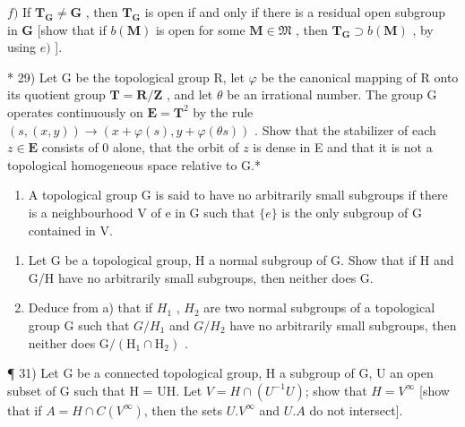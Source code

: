 \(f)\) If \(\mathbf{T}_{\mathbf{G}} \neq \mathbf{G}\) , then \(\mathbf{T}_{\mathbf{G}}\) is open if and only if there is a residual open subgroup in \(\mathbf{G}\) {[}show that if \(b(\mathbf{M})\) is open for some \(\mathbf{M} \in \mathfrak{M}\) , then \(\mathbf{T}_{\mathbf{G}} \supset b(\mathbf{M})\) , by using \(e)\) {]}.

* 29) Let G be the topological group R, let \(\varphi\) be the canonical mapping of R onto its quotient group \(\mathbf{T} = \mathbf{R} / \mathbf{Z}\) , and let \(\theta\) be an irrational number. The group G operates continuously on \(\mathbf{E} = \mathbf{T}^2\) by the rule \((s, (x, y)) \to (x + \varphi(s), y + \varphi(\theta s))\) . Show that the stabilizer of each \(z \in \mathbf{E}\) consists of 0 alone, that the orbit of \(z\) is dense in E and that it is not a topological homogeneous space relative to G.*

\begin{enumerate}
\def\labelenumi{\arabic{enumi})}
\setcounter{enumi}{29}
\tightlist
\item
  A topological group G is said to have no arbitrarily small subgroups if there is a neighbourhood V of e in G such that \(\{e\}\) is the only subgroup of G contained in V.
\end{enumerate}

\begin{enumerate}
\def\labelenumi{\alph{enumi})}
\item
  Let G be a topological group, H a normal subgroup of G. Show that if H and G/H have no arbitrarily small subgroups, then neither does G.
\item
  Deduce from a) that if \(H_{1}\) , \(H_{2}\) are two normal subgroups of a topological group G such that \(G/H_{1}\) and \(G/H_{2}\) have no arbitrarily small subgroups, then neither does \(\mathrm{G}/(\mathrm{H}_{1} \cap \mathrm{H}_{2})\) .
\end{enumerate}

¶ 31) Let G be a connected topological group, H a subgroup of G, U an open subset of G such that H = UH. Let \(V = H \cap (U^{-1}U)\); show that \(H = V^{\infty}\) {[}show that if \(A = H \cap C(V^{\infty})\), then the sets \(U.V^{\infty}\) and \(U.A\) do not intersect{]}.

